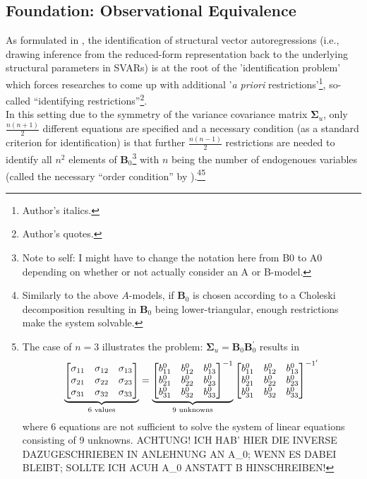 \documentclass[a4paper,11pt,listof=nochaptergap,oneside,pointednumbers,bibtotoc,bigheadings,liststotoc]{scrbook}
\theoremstyle{mysatz}
\theoremstyle{mydefinition}
\theoremstyle{mybemerkung}
\newcommand{\vect}[1]{\boldsymbol{\mathbf{#1}}}
\begin{document}
	
	
\subsection{Foundation: Observational Equivalence}
As formulated in \citet{rubioetal:10}, the identification of structural vector autoregressions (i.e., drawing inference from the reduced-form representation back to the underlying structural parameters in SVARs) is at the root of the 'identification problem' which forces researches to come up with additional '\textit{a priori} restrictions'\footnote{Author's italics.}, so-called ``identifying restrictions''\footnote{Author's quotes.}.\\
In this setting due to the symmetry of the variance covariance matrix $\vect{\Sigma}_u$, only $\frac{n(n+1)}{2}$ different equations are specified and a necessary condition (as a standard criterion for identification) is that further $\frac{n(n-1)}{2}$ restrictions are needed to identify all $n^2$ elements of $\vect{B}_0$\footnote{Note to self: I might have to change the notation here from B0 to A0 depending on whether or not \citet{ludvigsonetal:18} actually consider an A or B-model.} with $n$ being the number of endogenoues variables (called the necessary ``order condition'' by \citealp{rothenberg:71}).\footnote{Similarly to the above $A$-models, if $\vect{B}_0$ is chosen according to a Choleski decomposition resulting in $\vect{B}_0$ being lower-triangular, enough restrictions make the system solvable.}\footnote{The case of $n=3$ illustrates the problem: $\vect{\Sigma}_u = \vect{B}_0 \vect{B}_0^'$ results in $$		
		\underbrace{%
		\begin{bmatrix}
    		\sigma_{11} & \sigma_{12} & \sigma_{13} \\
		\sigma_{21} & \sigma_{22} & \sigma_{23} \\
		\sigma_{31} & \sigma_{32} & \sigma_{33}
 		\end{bmatrix}
}_{\text{6 values}} = \underbrace{%
		\begin{bmatrix}
    		b_{11}^0 & b_{12}^0 & b_{13}^0 \\
		b_{21}^0 & b_{22}^0 & b_{23}^0 \\
		b_{31}^0 & b_{32}^0 & b_{33}^0
 		\end{bmatrix}^{-1}
}_{\text{9 unknowns}}
\begin{bmatrix}
    		b_{11}^0 & b_{12}^0 & b_{13}^0 \\
		b_{21}^0 & b_{22}^0 & b_{23}^0 \\
		b_{31}^0 & b_{32}^0 & b_{33}^0
 		\end{bmatrix}^{{-1}'}$$ 
		where 6 equations are not sufficient to solve the system of linear equations consisting of 9 unknowns. ACHTUNG! ICH HAB' HIER DIE INVERSE DAZUGESCHRIEBEN IN ANLEHNUNG AN A_0; WENN ES DABEI BLEIBT; SOLLTE ICH ACUH A_0 ANSTATT B HINSCHREIBEN!}\\
\end{document}
